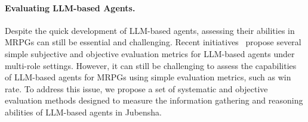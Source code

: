 \documentclass[11pt]{article}
\begin{document}
\paragraph{Evaluating LLM-based Agents.} Despite the quick development of LLM-based agents, assessing their abilities in MRPGs can still be essential and challenging. Recent initiatives~\cite{wang2023rolellm, shao2023character, liang2023tachikuma, xu2023exploring} propose several simple subjective and objective evaluation metrics for LLM-based agents under multi-role settings. However, it can still be challenging to assess the capabilities of LLM-based agents for MRPGs using simple evaluation metrics, such as win rate. To address this issue, we propose a set of systematic and objective evaluation methods designed to measure the information gathering and reasoning abilities of LLM-based agents in Jubensha.






\end{document}
